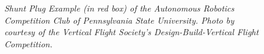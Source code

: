 \documentclass{article}
\begin{document}
\begin{figure}[h!]
  \centering
 \caption{\textit{Shunt Plug Example (in red box) of the Autonomous Robotics Competition Club of Pennsylvania State University. Photo by courtesy of the Vertical Flight Society's Design-Build-Vertical Flight Competition.}}
 \end{figure}

  
  
  
\end{document}
